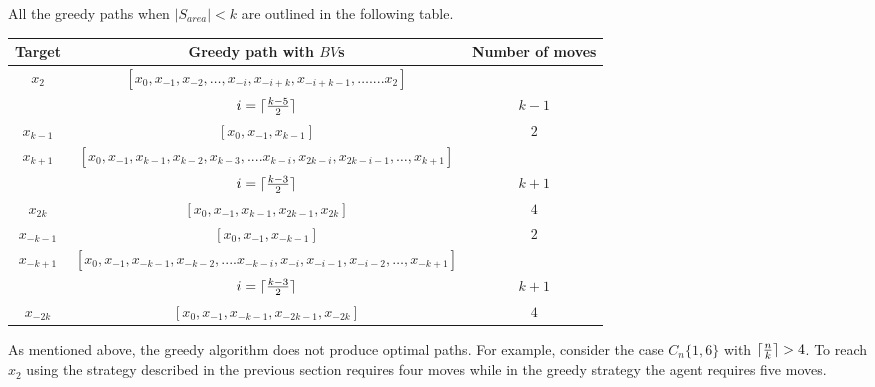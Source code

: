\noindent All the greedy paths when $\left\vert{S_{area}}\right\vert < k$ are outlined in the following table.

\begin{center}
  \begin{tabular}{|c|c|c|}
 \hline
 Target & Greedy path with $BV$s & Number of moves 
\\
 \hline
$x_2$ &$[x_0, x_{-1}, x_{-2},\ldots, x_{-i},x_{-i+k}, x_{-i+k-1},\ldots.... x_2]$ &\\
&$i =  \lceil{{ k-5} \over 2}\rceil$ & $k-1$ \\
\hline
 $x_{k-1}$ & $[x_0, x_{-1}, x_{k-1}]$ & $2$ \\

 \hline
 $x_{k+1}$ &  $[x_0, x_{-1}, x_{k-1}, x_{k-2}, x_{k-3},.... x_{k-i}, x_{2k-i}, x_{2k-i-1}, \ldots, x_{k+1}]$ &\\
    &  $i = \lceil{{ k-3} \over 2}\rceil$  & $k+1$ \\
 
 \hline
 $x_{2k}$ & $[x_0, x_{-1}, x_{k-1}, x_{2k-1},x_{2k}]$ & $4$ \\ %
              

\hline

$x_{-k-1}$ &$[x_0, x_{-1}, x_{-k-1}]$ & $2$ \\

\hline
 $x_{-k+1}$ & $[x_0, x_{-1}, x_{-k-1}, x_{-k-2},.... x_{-k-i}, x_{-i}, x_{-i-1}, x_{-i-2}, \ldots, x_{-k+1}]$ &\\
  &  $i = \lceil{{ k-3} \over 2}\rceil$ & $k+1$ \\
 \hline
 $x_{-2k}$ &  $[x_0, x_{-1}, x_{-k-1}, x_{-2k-1},x_{-2k}]$ & $4$ \\

 

\hline
\end{tabular} 
\label{greedy-path2}

 \end{center}

As mentioned above, the greedy algorithm does not produce  optimal paths.
For example, consider the case   $C_n\{1,6\}$  with  $ \lceil{n \over k}\rceil>4$.
To reach   $x_{2}$ using the   strategy  described in the previous section
 requires four moves while in the greedy strategy the agent  requires five moves.

 



